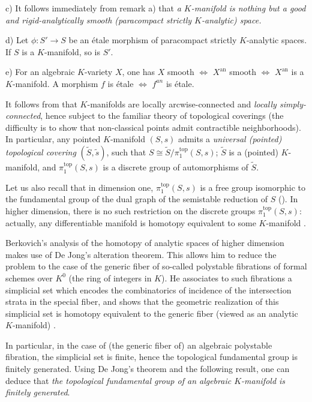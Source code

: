 \begin{para}
\begin{rems}
 c) It follows immediately from remark a) that {\it a
 $K$-manifold is nothing but a good and rigid-analytically smooth
 (paracompact strictly $K$-analytic) space.}

 d) Let $\phi:S'\to S$ be an \'etale morphism of paracompact
 strictly $K$-analytic spaces.  If $S$ is a $K$-manifold, so is $S'$.

 e) For an algebraic $K$-variety $X$, one has $X$ smooth
 $\iff$ $X^{\mathrm{an}}$ smooth $\iff$  $X^{\mathrm{an}}$ is a
 $K$-manifold.  A morphism $f$ is \'etale $\iff$ $f^{an}$ is \'etale.
\end{rems}

 \medskip 
 It follows from \cite[cor. 9.5]{spasalc} that $K$-manifolds are locally
 arcwise-connected and {\it locally simply-connected},
 hence subject to the familiar theory of topological coverings (the
 difficulty is to show that non-classical points admit contractible 
 neighborhoods).   
  In particular, any pointed $K$-manifold $(S,s)$ admits a {\it universal
 (pointed) topological covering} $(\tilde S,\tilde s)$, such that
 $S \cong \tilde S/\pi_1^{\mathrm{top}}(S,s)$; 
 $\tilde S$ is a (pointed) $K$-manifold, and  $\pi_1^{\mathrm{top}}(S,s)$
 is a discrete group of automorphisms of $\tilde S$.

 Let us also recall that in dimension one, $\pi_1^{\mathrm{top}}(S,s)$
 is a free group isomorphic to the fundamental group of the dual graph
 of the semistable reduction of $S$ (\cf \cite[5.3]{efgonas}). In higher
 dimension, there is no such restriction on the discrete groups
 $\pi_1^{\mathrm{top}}(S,s)$: actually, any differentiable manifold is
 homotopy equivalent to some $K$-manifold \cite[6.1.8]{staagonf}.
\end{para}

\begin{para}\label{para::1.1.2}
 Berkovich's analysis of the homotopy of analytic spaces of higher
 dimension makes use of De Jong's alteration theorem. This allows him to
 reduce the problem to the case of the generic fiber of so-called
 polystable fibrations of formal schemes over $K^0$ (the ring of
 integers in $K$). He associates to such fibrations a simplicial set
 which encodes the combinatorics of incidence of the intersection strata
 in the special fiber, and shows that the geometric realization of this
 simplicial set is homotopy equivalent to the generic fiber (viewed as
 an analytic $K$-manifold) \cite[5.4]{spasalc}.

 In particular, in the case of (the generic fiber of) an algebraic
 polystable fibration, the 
 simplicial set is finite, hence the topological fundamental group is
 finitely generated. Using De Jong's theorem and the following result,
 one can deduce that 
 {\it the topological fundamental group of an algebraic $K$-manifold is
 finitely generated}.
\end{para}

